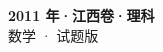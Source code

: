 \documentclass[zihao=-4, a4paper]{ctexart}
\begin{document}
\begin{center}
  {\Large\bfseries 2011 年·江西卷·理科}\\[4pt]
  {\large 数学 · 试题版}
\end{center}
\medskip
{}

\end{document}
